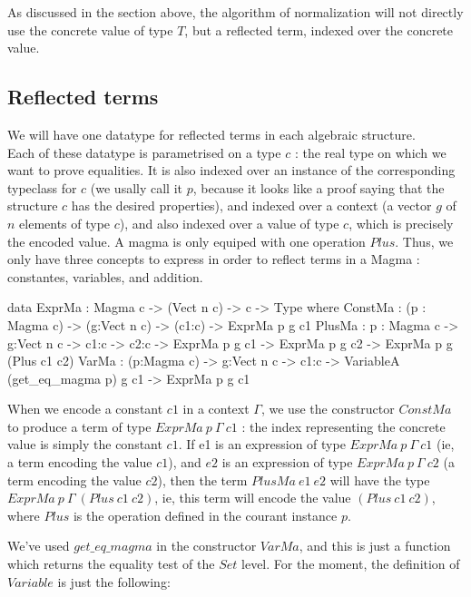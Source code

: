 \documentclass{sigplanconf}
\begin{document}
As discussed in the section above, the algorithm of normalization will not directly use the concrete value of type $T$, but a reflected term, indexed over the concrete value.


	\subsection {Reflected terms}

We will have one datatype for reflected terms in each algebraic structure. \\
Each of these datatype is parametrised on a type $c$ : the real type on which we want to prove equalities. It is also indexed over an instance of the corresponding typeclass for $c$ (we usally call it $p$, because it looks like a proof saying that the structure $c$ has the desired properties), and indexed over a context (a vector $g$ of $n$ elements of type $c$), and also indexed over a value of type $c$, which is precisely the encoded value.
A magma is only equiped with one operation $Plus$. Thus, we only have three concepts to express in order to reflect terms in a Magma : constantes, variables, and addition.

\begin{code}[caption=Reflected terms in a Magma, captionpos=b, label=lst1:haskell2]  
data ExprMa : Magma c -> (Vect n c) -> c -> 
              Type where
    ConstMa : (p : Magma c) -> (g:Vect n c) 
         -> (c1:c)  -> ExprMa p g c1 
    PlusMa : {p : Magma c} -> {g:Vect n c}
         -> {c1:c} -> {c2:c} 
         -> ExprMa p g c1 
         -> ExprMa p g c2 
         -> ExprMa p g (Plus c1 c2) 
    VarMa : (p:Magma c) -> {g:Vect n c}
         -> {c1:c} 
         -> VariableA (get_eq_magma p) g c1
         -> ExprMa p g c1
\end{code}	

When we encode a constant $c1$ in a context $\Gamma$, we use the constructor $ConstMa$ to produce a term of type $ExprMa\ p\ \Gamma\ c1$ : the index representing the concrete value is simply the constant $c1$.
If e1 is an expression of type $ExprMa\ p\ \Gamma\ c1$ (ie, a term encoding the value $c1$), and $e2$ is an expression of type $ExprMa\ p\ \Gamma\ c2$ (a term encoding the value $c2$), then the term $PlusMa\ e1\ e2$ will have the type $ExprMa\ p\ \Gamma\ (Plus\ c1\ c2)$, ie, this term will encode the value $(Plus\ c1\ c2)$, where $Plus$ is the operation defined in the courant instance $p$.


We've used $get\_eq\_magma$ in the constructor $VarMa$, and this is just a function which returns the equality test of the $Set$ level.
For the moment, the definition of $Variable$ is just the following:
\end{document}
